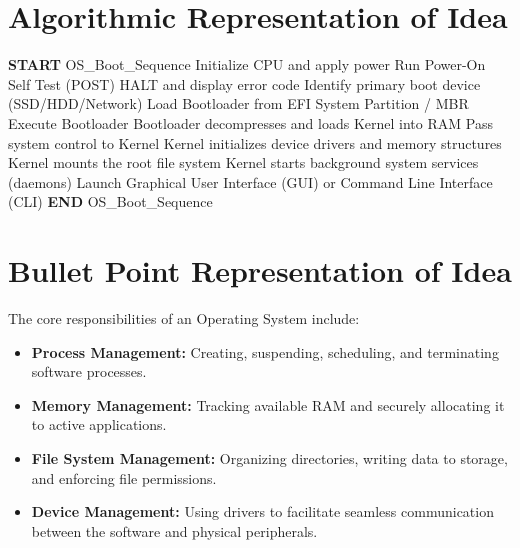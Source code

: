 \documentclass[11pt, a4paper]{article}
\begin{document}
\section*{Algorithmic Representation of Idea}
\begin{algorithm}[H]
\caption{OS Boot Sequence}
\begin{algorithmic}[1]
\State \textbf{START} OS\_Boot\_Sequence
\State Initialize CPU and apply power
\State Run Power-On Self Test (POST)
    \State HALT and display error code
\Else
    \State Identify primary boot device (SSD/HDD/Network)
    \State Load Bootloader from EFI System Partition / MBR
    \State Execute Bootloader
    \State Bootloader decompresses and loads Kernel into RAM
    \State Pass system control to Kernel
    \State Kernel initializes device drivers and memory structures
    \State Kernel mounts the root file system
    \State Kernel starts background system services (daemons)
    \State Launch Graphical User Interface (GUI) or Command Line Interface (CLI)
\EndIf
\State \textbf{END} OS\_Boot\_Sequence
\end{algorithmic}
\end{algorithm}

\section*{Bullet Point Representation of Idea}
The core responsibilities of an Operating System include:
\begin{itemize}
    \item \textbf{Process Management:} Creating, suspending, scheduling, and terminating software processes.
    \item \textbf{Memory Management:} Tracking available RAM and securely allocating it to active applications.
    \item \textbf{File System Management:} Organizing directories, writing data to storage, and enforcing file permissions.
    \item \textbf{Device Management:} Using drivers to facilitate seamless communication between the software and physical peripherals.
\end{itemize}
\end{document}
